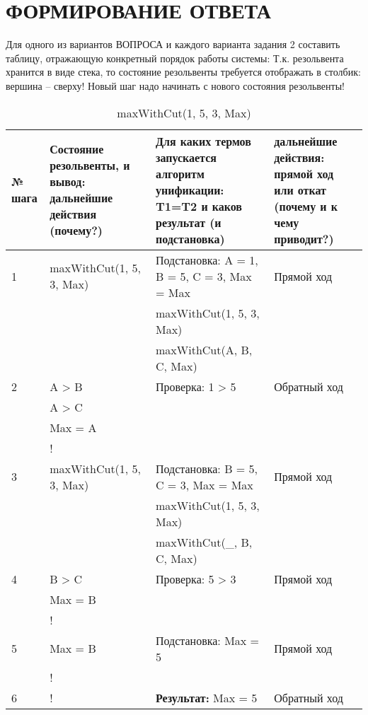 \section{ФОРМИРОВАНИЕ ОТВЕТА}

Для одного из вариантов ВОПРОСА и каждого варианта задания 2 составить таблицу, отражающую конкретный порядок работы системы: Т.к. резольвента хранится в виде стека, то состояние резольвенты требуется отображать в столбик: вершина – сверху! Новый шаг надо начинать с нового состояния резольвенты!

{
\small
\begin{longtable}{|p{1.15cm}|p{4cm}|p{6cm}|p{6cm}|}
    \caption{maxWithCut(1, 5, 3, Max)} \\
    \hline
    № шага & Состояние резольвенты, и вывод: дальнейшие действия (почему?) & Для каких термов запускается алгоритм унификации: T1=T2 и каков результат (и подстановка) & дальнейшие действия: прямой ход или откат (почему и к чему приводит?) \\
    \hline
    1 & maxWithCut(1, 5, 3, Max) & Подстановка: A = 1, B = 5, C = 3, Max = Max & Прямой ход \\
      & & maxWithCut(1, 5, 3, Max) & \\
      & & maxWithCut(A, B, C, Max) & \\
    \hline
    2 & A > B & Проверка: 1 > 5 & Обратный ход \\
      & A > C & & \\
      & Max = A & & \\
      & ! & & \\
    \hline
    3 & maxWithCut(1, 5, 3, Max) & Подстановка: B = 5, C = 3, Max = Max & Прямой ход \\
      & & maxWithCut(1, 5, 3, Max) & \\
      & & maxWithCut(\_, B, C, Max) & \\
    \hline
    4 & B > C & Проверка: 5 > 3 & Прямой ход \\
      & Max = B & & \\
      & ! & & \\
    \hline
    5 & Max = B & Подстановка: Max = 5 & Прямой ход \\
      & ! & & \\
    \hline
    6 & ! & \textbf{Результат:} Max = 5 & Обратный ход \\
    \hline
\end{longtable}
}

